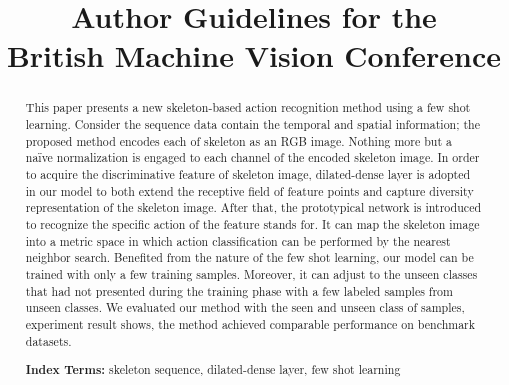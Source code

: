 \documentclass{bmvc2k}
\title{Author Guidelines for the\\ British Machine Vision Conference}
\begin{document}
\maketitle

\begin{abstract}
This paper presents a new skeleton-based action recognition method using a few shot learning. Consider the sequence data contain the temporal and spatial information; the proposed method encodes each of skeleton as an RGB image. Nothing more but a naïve normalization is engaged to each channel of the encoded skeleton image. In order to acquire the discriminative feature of skeleton image, dilated-dense layer is adopted in our model to both extend the receptive field of feature points and capture diversity representation of the skeleton image. After that, the prototypical network is introduced to recognize the specific action of the feature stands for. It can map the skeleton image into a metric space in which action classification can be performed by the nearest neighbor search. Benefited from the nature of the few shot learning, our model can be trained with only a few training samples. Moreover, it can adjust to the unseen classes that had not presented during the training phase with a few labeled samples from unseen classes. We evaluated our method with the seen and unseen class of samples, experiment result shows, the method achieved comparable performance on benchmark datasets.

\textbf{Index Terms:} skeleton sequence, dilated-dense layer, few shot learning
\end{abstract}

\end{document}

